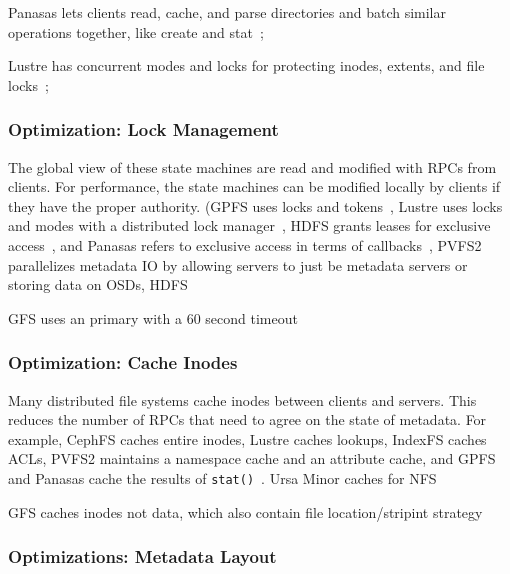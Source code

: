 Panasas lets clients read, cache, and
parse directories and batch similar operations together, like create and
stat~\cite{welch:fast08-panasas}; 

Lustre has concurrent modes and locks for
protecting inodes, extents, and file locks~\cite{wang:tech09-lustre}; 

\subsubsection{Optimization: Lock Management}

The global view of these state machines are read and modified with RPCs from
clients. For performance, the state machines can be modified locally by clients
if they have the proper authority.  (GPFS uses locks and
tokens~\cite{schmuck:fast2002-gpfs}, Lustre uses locks and modes with a
distributed lock manager~\cite{wang:tech09-lustre}, HDFS grants leases for
exclusive access~\cite{depardon:tech13-survey}, and Panasas refers to exclusive
access in terms of callbacks~\cite{nagle_panasas_2004}, PVFS2 parallelizes
metadata IO by allowing servers to just be metadata servers or storing data on OSDs, HDFS

GFS uses an primary with a 60 second timeout

\subsubsection{Optimization: Cache Inodes}

Many distributed file systems cache inodes between clients and servers. This
reduces the number of RPCs that need to agree on the state of metadata.
For example, CephFS caches entire inodes, Lustre caches lookups, IndexFS caches
ACLs, PVFS2 maintains a namespace cache and an attribute cache, and GPFS and
Panasas cache the results of \texttt{stat()}~\cite{docs:cephcaps,
schmuck:fast2002-gpfs, wang:tech09-lustre, depardon:tech13-survey}. Ursa Minor caches for NFS

GFS caches inodes not data, which also contain file location/stripint strategy


\subsubsection{Optimizations: Metadata Layout}


